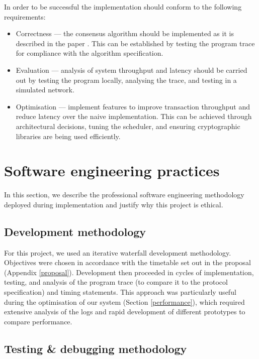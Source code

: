 In order to be successful the implementation should conform to the following requirements:
\begin{itemize}
	\item Correctness --- the consensus algorithm should be implemented as it is described in the paper \cite{yinHotStuffBFTConsensus2019}. This can be established by testing the program trace for compliance with the algorithm specification.
	\item Evaluation --- analysis of system throughput and latency should be carried out by testing the program locally, analysing the trace, and testing in a simulated network.
	\item Optimisation --- implement features to improve transaction throughput and reduce latency over the naive implementation. This can be achieved through architectural decisions, tuning the scheduler, and ensuring cryptographic libraries are being used efficiently.
\end{itemize}

\section{Software engineering practices} \label{softwareeng}

In this section, we describe the professional software engineering methodology deployed during implementation and justify why this project is ethical.

\subsection{Development methodology} \label{devmethods}

For this project, we used an iterative waterfall development methodology. Objectives were chosen in accordance with the timetable set out in the proposal (Appendix \ref{proposal}). Development then proceeded in cycles of implementation, testing, and analysis of the program trace (to compare it to the protocol specification) and timing statements. This approach was particularly useful during the optimisation of our system (Section \ref{performance}), which required extensive analysis of the logs and rapid development of different prototypes to compare performance.

\subsection{Testing \& debugging methodology} \label{testing}

